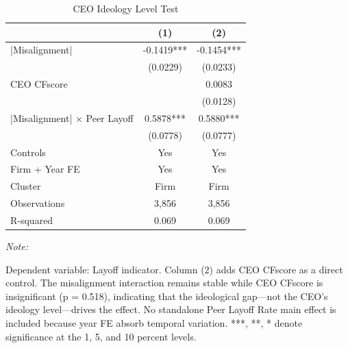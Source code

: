 \documentclass[
  10pt,
]{article}
\begin{document}
\newpage

\begin{table}[!h]
\centering
\caption{\label{tab:table6}CEO Ideology Level Test}
\centering
\fontsize{9}{11}\selectfont
\begin{threeparttable}
\begin{tabular}[t]{lcc}
\toprule
 & (1) & (2)\\
\midrule
|Misalignment| & -0.1419*** & -0.1454***\\
 & (0.0229) & (0.0233)\\
CEO CFscore &  & 0.0083\\
 &  & (0.0128)\\
|Misalignment| × Peer Layoff & 0.5878*** & 0.5880***\\
\addlinespace
 & (0.0778) & (0.0777)\\
\midrule
Controls & Yes & Yes\\
Firm + Year FE & Yes & Yes\\
Cluster & Firm & Firm\\
Observations & 3,856 & 3,856\\
\addlinespace
R-squared & 0.069 & 0.069\\
\bottomrule
\end{tabular}
\begin{tablenotes}[para]
\item \textit{Note: } 
\item Dependent variable: Layoff indicator. Column (2) adds CEO CFscore as a direct control. The misalignment interaction remains stable while CEO CFscore is insignificant (p = 0.518), indicating that the ideological gap---not the CEO's ideology level---drives the effect. No standalone Peer Layoff Rate main effect is included because year FE absorb temporal variation. ***, **, * denote significance at the 1, 5, and 10 percent levels.
\end{tablenotes}
\end{threeparttable}
\end{table}

\newpage
\end{document}
